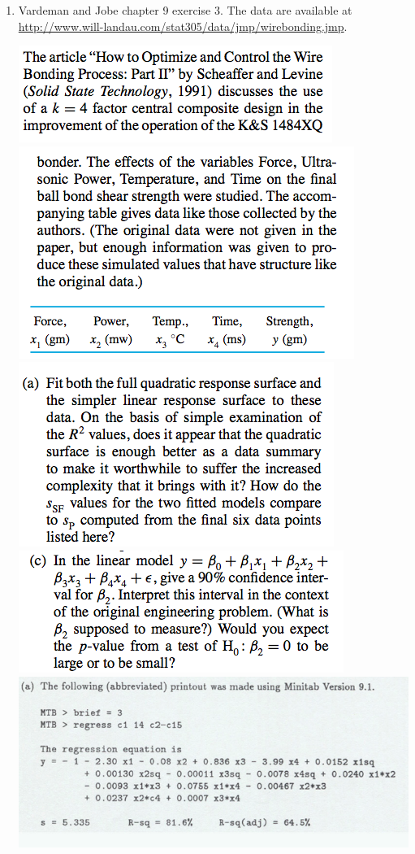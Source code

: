 \documentclass{article}\usepackage{graphicx, color}
\providecommand{\q}{$\quad$ \newline}
\numberwithin{equation}{section}
\begin{document}
\begin{flushleft}
\begin{enumerate}[1. ]
\item Vardeman and Jobe chapter 9 exercise 3. The data are available at \url{http://www.will-landau.com/stat305/data/jmp/wirebonding.jmp}.  \q

 \includegraphics{../../fig/finalreviewp4-1.png}
 \includegraphics{../../fig/finalreviewp4-2.png}
 \includegraphics{../../fig/finalreviewp4-3.png}
 \includegraphics{../../fig/finalreviewp4-4.png}
 \includegraphics{../../fig/finalreviewp4sol1.png}

\end{enumerate}
\end{flushleft}
\end{document}

